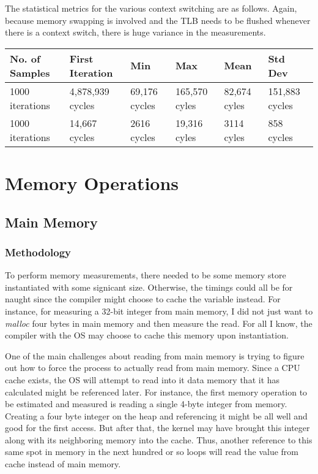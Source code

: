 \documentclass[paper=a4, fontsize=11pt]{scrartcl}
\numberwithin{equation}{section}        %
\numberwithin{figure}{section}          %
\numberwithin{table}{section}               %
\begin{document}
The statistical metrics for the various context switching are as follows.  Again, because memory swapping is involved and the TLB needs to be flushed whenever there is a context switch, there is huge variance in the measurements.

\begin{center}
    \begin{tabular}{ | l | l | l | l | l | l |}
    \hline
    No. of Samples & First Iteration & Min & Max & Mean & Std Dev \\ \hline
    1000 iterations & 4,878,939 cycles & 69,176 cycles & 165,570 cyles & 82,674 cyles & 151,883  cycles \\ 
    1000 iterations & 14,667 cycles & 2616 cycles & 19,316 cyles & 3114 cyles & 858 cycles \\ 
    \hline
    \end{tabular}
\end{center}

\section{Memory Operations}



\subsection{Main Memory}

\subsubsection{Methodology}

To perform memory measurements, there needed to be some memory store instantiated with some signicant size.  Otherwise, the timings could all be for naught since the compiler might choose to cache the variable instead.  For instance, for measuring a 32-bit integer from main memory, I did not just want to \textit{malloc} four bytes in main memory and then measure the read.  For all I know, the compiler with the OS may choose to cache this memory upon instantiation.

One of the main challenges about reading from main memory is trying to figure out how to force the process to actually read from main memory.  Since a CPU cache exists, the OS will attempt to read into it data memory that it has calculated might be referenced later.  For instance, the first memory operation to be estimated and measured is reading a single 4-byte integer from memory.  Creating a four byte integer on the heap and referencing it might be all well and good for the first access.  But after that, the kernel may have brought this integer along with its neighboring memory into the cache.  Thus, another reference to this same spot in memory in the next hundred or so loops will read the value from cache instead of main memory.
\end{document}
